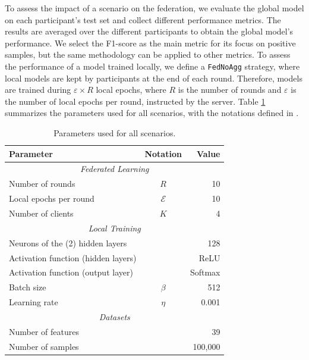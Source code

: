 To assess the impact of a scenario on the federation, we evaluate the global model on each participant's test set and collect different performance metrics.
The results are averaged over the different participants to obtain the global model's performance.
We select the F1-score as the main metric for its focus on positive samples, but the same methodology can be applied to other metrics.
To assess the performance of a model trained locally, we define a \texttt{FedNoAgg} strategy, where local models are kept by participants at the end of each round. 
Therefore, models are trained during $\varepsilon \times R$ local epochs, where $R$ is the number of rounds and $\varepsilon$ is the number of local epochs per round, instructed by the server.
Table \ref{tbl:parameters} summarizes the parameters used for all scenarios, with the notations defined in .


\begin{table}
  \centering
  \caption{Parameters used for all scenarios.}
  \label{tbl:parameters}
  \begin{tabular}{lcr}
     \toprule
      \textbf{Parameter} & \textbf{Notation} & \textbf{Value} \\
      \midrule
      \multicolumn{3}{c}{\emph{Federated Learning}} \\
      \midrule
      Number of rounds & $R$ & 10 \\
      Local epochs per round & $\mathcal{E}$ & 10 \\
      Number of clients & $K$ & 4 \\
      \midrule
      \multicolumn{3}{c}{\emph{Local Training}} \\
      \midrule
      Neurons of the (2) hidden layers &  & 128 \\
      Activation function (hidden layers) &  & ReLU \\
      Activation function (output layer) &  & Softmax \\
      Batch size & $\beta$ & 512 \\
      Learning rate & $\eta$ & 0.001 \\
      \midrule
      \multicolumn{3}{c}{\emph{Datasets}} \\
      \midrule
      Number of features &  & 39 \\
      Number of samples &  & 100,000 \\
      \bottomrule
  \end{tabular}
\end{table}

